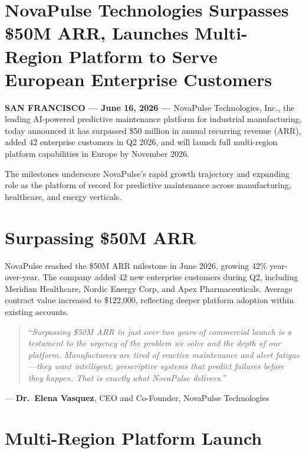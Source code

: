 \documentclass[
    language=english,
    doctype=press-release,
    institution=none,
]{../../omnilatex}
\begin{document}
\maketitle

\section*{NovaPulse Technologies Surpasses \$50M ARR, Launches Multi-Region Platform to Serve European Enterprise Customers}

\noindent\textbf{SAN FRANCISCO --- June 16, 2026 ---} NovaPulse Technologies,
Inc., the leading AI-powered predictive maintenance platform for industrial
manufacturing, today announced it has surpassed \$50 million in annual
recurring revenue (ARR), added 42 enterprise customers in Q2 2026, and will
launch full multi-region platform capabilities in Europe by November 2026.

The milestones underscore NovaPulse's rapid growth trajectory and expanding
role as the platform of record for predictive maintenance across
manufacturing, healthcare, and energy verticals.

\section*{Surpassing \$50M ARR}

NovaPulse reached the \$50M ARR milestone in June 2026, growing 42\%
year-over-year. The company added 42 new enterprise customers during Q2,
including Meridian Healthcare, Nordic Energy Corp, and Apex Pharmaceuticals.
Average contract value increased to \$122,000, reflecting deeper platform
adoption within existing accounts.

\begin{quote}
``\textit{Surpassing \$50M ARR in just over two years of commercial
launch is a testament to the urgency of the problem we solve and the
depth of our platform. Manufacturers are tired of reactive maintenance
and alert fatigue---they want intelligent, prescriptive systems that
predict failures before they happen. That is exactly what NovaPulse
delivers.''}
\end{quote}

\vspace{0.5em}
\noindent--- \textbf{Dr.\ Elena Vasquez}, CEO and Co-Founder, NovaPulse Technologies

\section*{Multi-Region Platform Launch}
\end{document}
